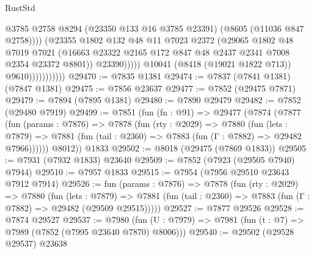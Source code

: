 \begin{lexlean}{RustStd}
\begin{coremodule}
                                      @3785
                                      @2758
                                      @8294
                                      (@23350 @133 @16 @3785 @23391)
                                      (@8605 (@11036 @847 @2758))))
                                  (@23355
                                    @1802
                                    @132
                                    @48
                                    @11
                                    @7023
                                    @2372
                                    (@29065
                                      @1802
                                      @48
                                      @7019
                                      @7021
                                      (@16663
                                        @23322
                                        @2165
                                        @172
                                        @847
                                        @48
                                        @2437
                                        @2341
                                        @7008
                                        @2354
                                        @23372
                                        @8801))
                                    @23390)))))
                          @10041
                          (@8418 (@19021 @1822 @713))
                          @9610)))))))))))
@29470 := @7835 @1381
@29474 := @7837 (@7841 @1381) (@7847 @1381)
@29475 := @7856 @23637
@29477 := @7852 (@29475 @7871)
@29479 := @7894 (@7895 @1381)
@29480 := @7890 @29479
@29482 := @7852 (@29480 @7919)
@29499 := @7851
    (fun (fn : @91) =>
    @29477
      (@7874
        (@7877
          (fun (params : @7876) =>
          @7878
            (fun (rty : @2029) =>
            @7880
              (fun (lets : @7879) =>
              @7881 (fun (tail : @2360) => @7883 (fun (Γ : @7882) => @29482 @7966))))))
        @8012))
    @1833
@29502 := @8018 (@29475 (@7869 @1833))
@29505 := @7931 (@7932 @1833) @23640
@29509 := @7852 (@7923 (@29505 @7940) @7944)
@29510 := @7957 @1833
@29515 := @7954 (@7956 @29510 @23643 @7912 @7914)
@29526 := fun (params : @7876) =>
  @7878
    (fun (rty : @2029) =>
    @7880
      (fun (lets : @7879) =>
      @7881 (fun (tail : @2360) => @7883 (fun (Γ : @7882) => @29482 (@29509 @29515)))))
@29527 := @7877 @29526
@29528 := @7874 @29527
@29537 := @7980
    (fun (U : @7979) => @7981 (fun (t : @7) => @7989 (@7852 (@7995 @23640 @7870) @8006)))
@29540 := @29502 (@29528 @29537) @23638

\end{coremodule}
\end{lexlean}

